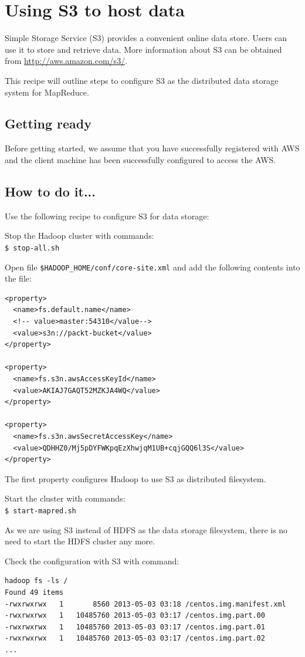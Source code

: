\section{Using S3 to host data}
Simple Storage Service (S3) provides a convenient online data store. Users can use it to store and retrieve data. More information about S3 can be obtained from \url{http://aws.amazon.com/s3/}.

This recipe will outline steps to configure S3 as the distributed data storage system for MapReduce.

\subsection*{Getting ready}
Before getting started, we assume that you have successfully registered with AWS and the client machine has been successfully configured to access the AWS.

\subsection*{How to do it...}
Use the following recipe to configure S3 for data storage:

Stop the Hadoop cluster with commands: \\
\verb|$ stop-all.sh|

Open file \verb|$HADOOP_HOME/conf/core-site.xml| and add the following contents into the file:
\lstset{style=bashstyle}
\begin{lstlisting}
<property>
  <name>fs.default.name</name>
  <!-- value>master:54310</value-->
  <value>s3n://packt-bucket</value>
</property>

<property>
  <name>fs.s3n.awsAccessKeyId</name>
  <value>AKIAJ7GAQT52MZKJA4WQ</value>
</property>

<property>
  <name>fs.s3n.awsSecretAccessKey</name>
  <value>QDHHZ0/Mj5pDYFWKpqEzXhwjqM1UB+cqjGQQ6l3S</value>
</property>
\end{lstlisting}

The first property configures Hadoop to use S3 as distributed filesystem.


Start the cluster with commands: \\
\verb|$ start-mapred.sh|

As we are using S3 instead of HDFS as the data storage filesystem, there is no need to start the HDFS cluster any more.

Check the configuration with S3 with command:
\lstset{style=bashstyle}
\begin{lstlisting}
hadoop fs -ls /
Found 49 items
-rwxrwxrwx   1       8560 2013-05-03 03:18 /centos.img.manifest.xml
-rwxrwxrwx   1   10485760 2013-05-03 03:17 /centos.img.part.00
-rwxrwxrwx   1   10485760 2013-05-03 03:17 /centos.img.part.01
-rwxrwxrwx   1   10485760 2013-05-03 03:17 /centos.img.part.02
...
\end{lstlisting}

